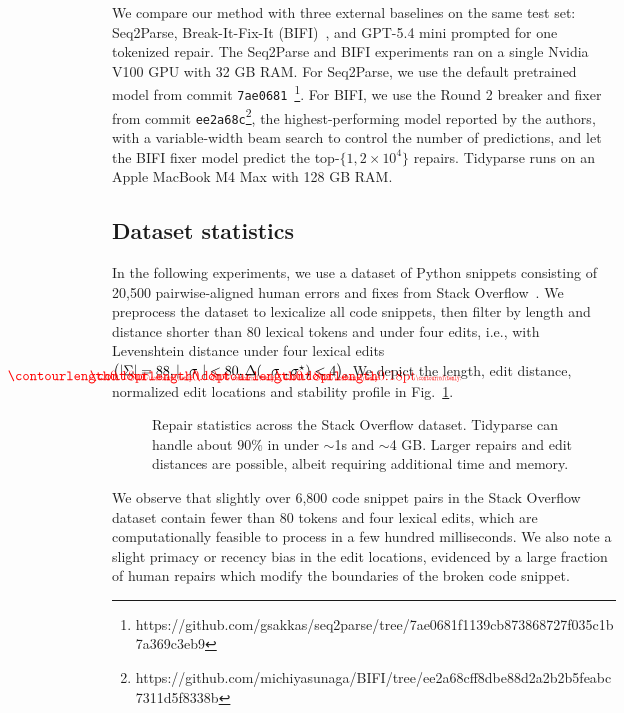 \documentclass[popl.tex]{subfiles}
\begin{document}
We compare our method with three external baselines on the same test set: Seq2Parse, Break-It-Fix-It (BIFI)~\cite{yasunaga2021break}, and GPT-5.4 mini prompted for one tokenized repair. The Seq2Parse and BIFI experiments ran on a single Nvidia V100 GPU with 32 GB RAM. For Seq2Parse, we use the default pretrained model from commit \texttt{7ae0681}~\footnote{https://github.com/gsakkas/seq2parse/tree/7ae0681f1139cb873868727f035c1b7a369c3eb9}. For BIFI, we use the Round 2 breaker and fixer from commit \texttt{ee2a68c}\footnote{https://github.com/michiyasunaga/BIFI/tree/ee2a68cff8dbe88d2a2b2b5feabc7311d5f8338b}, the highest-performing model reported by the authors, with a variable-width beam search to control the number of predictions, and let the BIFI fixer model predict the top-$\{1, 2\times 10^4\}$ repairs. Tidyparse runs on an Apple MacBook M4 Max with 128 GB RAM.

\clearpage\subsection{Dataset statistics}\label{sec:rq1}

In the following experiments, we use a dataset of Python snippets consisting of 20,500 pairwise-aligned human errors and fixes from Stack Overflow~\cite{wong2019syntax}. We preprocess the dataset to lexicalize all code snippets, then filter by length and distance shorter than 80 lexical tokens and under four edits, i.e., with Levenshtein distance under four lexical edits $\big(|\Sigma| = 88, |\err{\sigma}| < 80, \Delta(\err{\sigma}, \sigma^\star) < 4\big)$. We depict the length, edit distance, normalized edit locations and stability profile in Fig.~\ref{fig:patch_stats}.\vspace{-0.2cm}

\begin{figure}[h!]

\vspace{-0.2cm}
\caption{Repair statistics across the Stack Overflow dataset. Tidyparse can handle about $90\%$ in under $\sim$1s and $\sim$4 GB. Larger repairs and edit distances are possible, albeit requiring additional time and memory.}\label{fig:patch_stats}\vspace{-0.2cm}
\end{figure}

We observe that slightly over 6,800 code snippet pairs in the Stack Overflow dataset contain fewer than 80 tokens and four lexical edits, which are computationally feasible to process in a few hundred milliseconds. We also note a slight primacy or recency bias in the edit locations, evidenced by a large fraction of human repairs which modify the boundaries of the broken code snippet.
\end{document}
